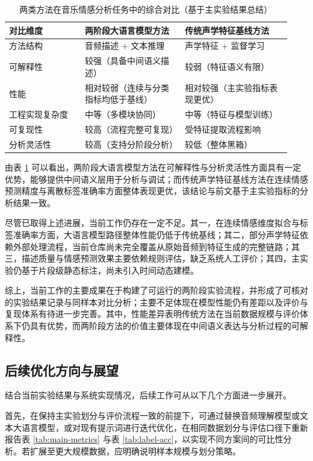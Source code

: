 \begin{table}[htbp]
  \centering
  \caption{两类方法在音乐情感分析任务中的综合对比（基于主实验结果总结）}
  \label{tab:method-comparison}
  \begin{tabular}{p{0.25\linewidth}p{0.33\linewidth}p{0.35\linewidth}}
    \hline
    对比维度 & 两阶段大语言模型方法 & 传统声学特征基线方法 \\
    \hline
    方法结构 & 音频描述 + 文本推理 & 声学特征 + 监督学习 \\
    可解释性 & 较强（具备中间语义描述） & 较弱（特征语义有限） \\
    性能 & 相对较弱（连续与分类指标均低于基线） & 相对较强（主实验指标表现更优） \\
    工程实现复杂度 & 中等（多模块协同） & 中等（特征与模型训练） \\
    可复现性 & 较高（流程完整可复现） & 受特征提取流程影响 \\
    分析灵活性 & 较高（支持分阶段分析） & 较低（整体黑箱） \\
    \hline
  \end{tabular}
\end{table}

由表 \ref{tab:method-comparison} 可以看出，两阶段大语言模型方法在可解释性与分析灵活性方面具有一定优势，能够提供中间语义层用于分析与调试；而传统声学特征基线方法在连续情感预测精度与离散标签准确率方面整体表现更优，该结论与前文基于主实验指标的分析结果一致。

尽管已取得上述进展，当前工作仍存在一定不足。其一，在连续情感维度拟合与标签准确率方面，大语言模型路径整体性能仍低于传统基线；其二，部分声学特征依赖外部处理流程，当前仓库尚未完全覆盖从原始音频到特征生成的完整链路；其三，描述质量与情感预测效果主要依赖规则评估，缺乏系统人工评价；其四，主实验仍基于片段级静态标注，尚未引入时间动态建模。

综上，当前工作的主要成果在于构建了可运行的两阶段实验流程，并形成了可核对的实验结果记录与同样本对比分析；主要不足体现在模型性能仍有差距以及评价与复现体系有待进一步完善。其中，性能差异表明传统方法在当前数据规模与评价体系下仍具有优势，而两阶段方法的价值主要体现在中间语义表达与分析过程的可解释性。

\subsection{后续优化方向与展望}
结合当前实验结果与系统实现情况，后续工作可从以下几个方面进一步展开。

首先，在保持主实验划分与评价流程一致的前提下，可通过替换音频理解模型或文本大语言模型，或对现有提示词进行迭代优化，在相同数据划分与评估口径下重新报告表 \ref{tab:main-metrics} 与表 \ref{tab:label-acc}，以实现不同方案间的可比性分析。若扩展至更大规模数据，应明确说明样本规模与划分策略。

